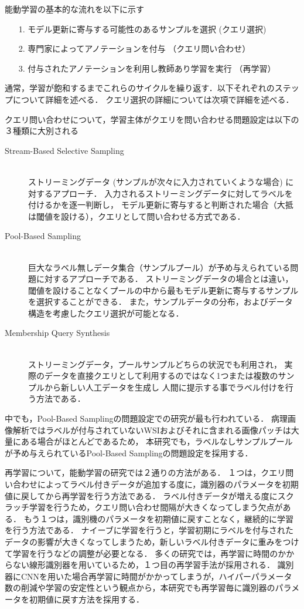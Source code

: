 能動学習の基本的な流れを以下に示す
\begin{itemize}
    \item[1.] モデル更新に寄与する可能性のあるサンプルを選択 (クエリ選択)
    \item[2.] 専門家によってアノテーションを付与 （クエリ問い合わせ）
    \item[3.] 付与されたアノテーションを利用し教師あり学習を実行 （再学習）
\end{itemize}
通常，学習が飽和するまでこれらのサイクルを繰り返す．以下それぞれのステップについて詳細を述べる．
クエリ選択の詳細については次項で詳細を述べる． 

クエリ問い合わせについて，学習主体がクエリを問い合わせる問題設定は以下の３種類に大別される
\begin{description}
    \item[Stream-Based Selective Sampling]\mbox{}\\
        ストリーミングデータ (サンプルが次々に入力されていくような場合) に対するアプローチ．
        入力されるストリーミングデータに対してラベルを付けるかを逐一判断し，
        モデル更新に寄与すると判断された場合（大抵は閾値を設ける），クエリとして問い合わせる方式である．
    \item[Pool-Based Sampling]\mbox{}\\
        巨大なラベル無しデータ集合（サンプルプール）が予め与えられている問題に対するアプローチである．
        ストリーミングデータの場合とは違い，閾値を設けることなくプールの中から最もモデル更新に寄与するサンプルを選択することができる．
        また，サンプルデータの分布，およびデータ構造を考慮したクエリ選択が可能となる．
    \item[Membership Query Synthesis]\mbox{}\\ 
        ストリーミングデータ，プールサンプルどちらの状況でも利用され，
        実際のデータを直接クエリとして利用するのではなく1つまたは複数のサンプルから新しい人工データを生成し
        人間に提示する事でラベル付けを行う方法である．
\end{description}
中でも，Pool-Based Samplingの問題設定での研究が最も行われている．
病理画像解析ではラベルが付与されていないWSIおよびそれに含まれる画像パッチは大量にある場合がほとんどであるため，
本研究でも，ラベルなしサンプルプールが予め与えられているPool-Based Samplingの問題設定を採用する．

再学習について，能動学習の研究では２通りの方法がある．
１つは，クエリ問い合わせによってラベル付きデータが追加する度に，識別器のパラメータを初期値に戻してから再学習を行う方法である．
ラベル付きデータが増える度にスクラッチ学習を行うため，クエリ問い合わせ間隔が大きくなってしまう欠点がある．
もう１つは，識別機のパラメータを初期値に戻すことなく，継続的に学習を行う方法である．
ナイーブに学習を行うと，学習初期にラベルを付与されたデータの影響が大きくなってしまうため，新しいラベル付きデータに重みをつけて学習を行うなどの調整が必要となる．
多くの研究では，再学習に時間のかからない線形識別器を用いているため，１つ目の再学習手法が採用される．
識別器にCNNを用いた場合再学習に時間がかかってしまうが，ハイパーパラメータ数の削減や学習の安定性という観点から，本研究でも再学習毎に識別器のパラメータを初期値に戻す方法を採用する．


